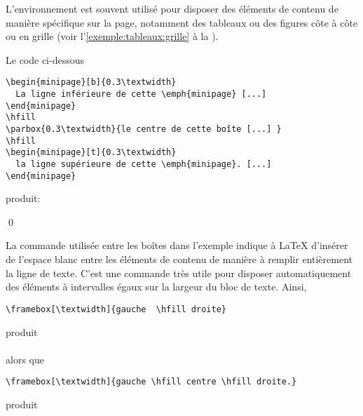 L'environnement  est souvent utilisé pour disposer des
éléments de contenu de manière spécifique sur la page, notamment des
tableaux ou des figures côte à côte ou en grille (voir
l'\autoref{exemple:tableaux:grille} à la
).

\begin{exemple}
  Le code ci-dessous
\begin{lstlisting}
\begin{minipage}[b]{0.3\textwidth}
  La ligne inférieure de cette \emph{minipage} [...]
\end{minipage}
\hfill
\parbox{0.3\textwidth}{le centre de cette boîte [...] }
\hfill
\begin{minipage}[t]{0.3\textwidth}
  la ligne supérieure de cette \emph{minipage}. [...]
\end{minipage}
\end{lstlisting}
  produit: \\[0.5\baselineskip]
  \begin{minipage}{\textwidth}
    \makebox[0pt][l]{\color{lightgray}\rule{\textwidth}{0.7pt}}\relax
     \hfill {}
    \hfill {}
  \end{minipage}
  \qed
\end{exemple}

La commande \cmd{\hfill} utilisée entre les boîtes dans l'exemple
indique à {\LaTeX} d'insérer de l'espace blanc entre les éléments de
contenu de manière à remplir entièrement la ligne de texte. C'est une
commande très utile pour disposer automatiquement des éléments à
intervalles égaux sur la largeur du bloc de texte. Ainsi,
\begin{lstlisting}
\framebox[\textwidth]{gauche  \hfill droite}
\end{lstlisting}
produit \\[0.5\baselineskip]
 \\[0.5\baselineskip]
alors que
\begin{lstlisting}
\framebox[\textwidth]{gauche \hfill centre \hfill droite.}
\end{lstlisting}
produit \\[0.5\baselineskip]



